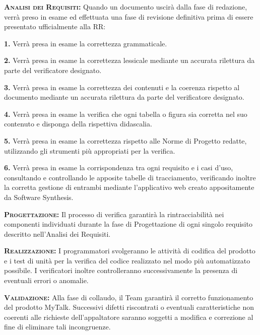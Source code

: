 \begin{description}
	\item{\scshape\bfseries Analisi dei Requisiti:} Quando un documento uscirà dalla fase di redazione, verrà preso in esame ed effettuata una fase di revisione definitiva prima di essere presentato ufficialmente alla RR: 
\begin{description}
		\item{\scshape\bfseries 1.} Verrà presa in esame la correttezza grammaticale.
		\item{\scshape\bfseries 2.} Verrà presa in esame la correttezza lessicale mediante un accurata rilettura da parte del verificatore designato.
		\item{\scshape\bfseries 3.} Verrà presa in esame la correttezza dei contenuti e la coerenza rispetto al documento mediante un accurata rilettura da parte del verificatore designato.
		\item{\scshape\bfseries 4.} Verrà presa in esame la verifica che ogni tabella o figura sia corretta nel suo contenuto e disponga della rispettiva didascalia.
		\item{\scshape\bfseries 5.} Verrà presa in esame la correttezza rispetto alle Norme di Progetto redatte, utilizzando gli strumenti più appropriati per la verifica.
		\item{\scshape\bfseries 6.} Verrà presa in esame la corrispondenza tra ogni requisito e i casi d'uso, consultando e controllando le apposite tabelle di tracciamento, verificando inoltre la corretta gestione di entrambi mediante l'applicativo web creato appositamente da Software Synthesis.
\end{description}
	\item{\scshape\bfseries Progettazione:} Il processo di verifica garantirà la rintracciabilità nei componenti individuati durante la fase di Progettazione di ogni singolo requisito descritto nell'Analisi dei Requisiti.
	\item{\scshape\bfseries Realizzazione:} I programmatori svolgeranno le attività di codifica del prodotto e i test di unità per la verifica del codice realizzato nel modo più automatizzato possibile. I verificatori inoltre controlleranno successivamente la presenza di eventuali errori o anomalie.
	\item{\scshape\bfseries Validazione:} Alla fase di collaudo, il Team garantirà il corretto funzionamento del prodotto MyTalk. Successivi difetti riscontrati o eventuali caratteristiche non coerenti alle richieste dell'appaltatore saranno soggetti a modifica e correzione al fine di eliminare tali incongruenze. 
\end{description}

